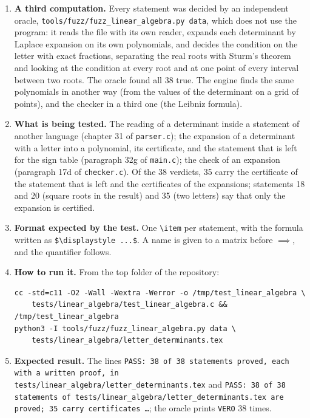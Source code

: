 \documentclass[11pt,a4paper]{article}
\begin{document}
\begin{enumerate}
\item \textbf{A third computation.} Every statement was decided by an independent oracle, \texttt{tools/fuzz/fuzz\_linear\_algebra.py data}, which does not use the program: it reads the file with its own reader, expands each determinant by Laplace expansion on its own polynomials, and decides the condition on the letter with exact fractions, separating the real roots with Sturm's theorem and looking at the condition at every root and at one point of every interval between two roots. The oracle found all 38 true. The engine finds the same polynomials in another way (from the values of the determinant on a grid of points), and the checker in a third one (the Leibniz formula).

\item \textbf{What is being tested.} The reading of a determinant inside a statement of another language (chapter 31 of \texttt{parser.c}); the expansion of a determinant with a letter into a polynomial, its certificate, and the statement that is left for the sign table (paragraph 32g of \texttt{main.c}); the check of an expansion (paragraph 17d of \texttt{checker.c}). Of the 38 verdicts, 35 carry the certificate of the statement that is left and the certificates of the expansions; statements 18 and 20 (square roots in the result) and 35 (two letters) say that only the expansion is certified.

\item \textbf{Format expected by the test.} One \texttt{\textbackslash item} per statement, with the formula written as \texttt{\$\textbackslash displaystyle ...\$}. A name is given to a matrix before $\implies$, and the quantifier follows.

\item \textbf{How to run it.} From the top folder of the repository:
\begin{verbatim}
cc -std=c11 -O2 -Wall -Wextra -Werror -o /tmp/test_linear_algebra \
    tests/linear_algebra/test_linear_algebra.c && /tmp/test_linear_algebra
python3 -I tools/fuzz/fuzz_linear_algebra.py data \
    tests/linear_algebra/letter_determinants.tex
\end{verbatim}

\item \textbf{Expected result.} The lines \texttt{PASS: 38 of 38 statements proved, each with a written proof, in tests/linear\_algebra/letter\_determinants.tex} and \texttt{PASS: 38 of 38 statements of tests/linear\_algebra/letter\_determinants.tex are proved; 35 carry certificates \dots}; the oracle prints \texttt{VERO} 38 times.
\end{enumerate}
\end{document}
